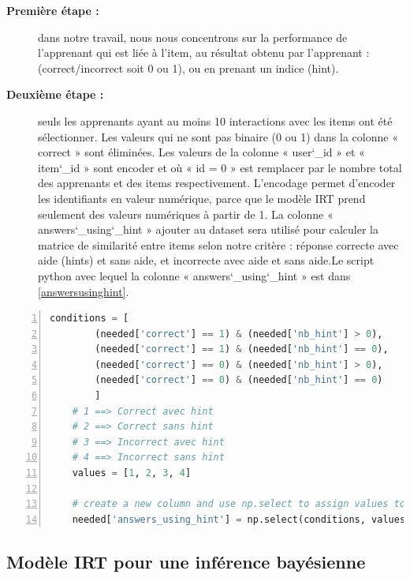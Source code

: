 \begin{description}
    \item[\textbf{Première étape : }] dans notre travail, nous nous concentrons sur la performance de l'apprenant qui est liée à l'item, au résultat obtenu par l'apprenant : (correct/incorrect soit 0 ou 1), ou en prenant un indice (hint).
    \item[\textbf{Deuxième étape : }] seuls les apprenants ayant au moins 10 interactions avec les items ont été sélectionner. Les valeurs qui ne sont pas binaire (0 ou 1) dans la colonne « correct » sont éliminées. Les valeurs de la colonne « user\char`_id »  et « item\char`_id » sont encoder et où « id = 0 » est remplacer par le nombre total des apprenants et des items respectivement. L’encodage permet d’encoder les identifiants en valeur numérique, parce que le modèle IRT prend seulement des valeurs numériques à partir de 1. La colonne « answers\char`_using\char`_hint » ajouter au dataset sera utilisé pour calculer la matrice de similarité entre items selon notre critère : réponse correcte avec aide (hints) et sans aide, et incorrecte avec aide et sans aide.Le script python avec lequel la colonne « answers\char`_using\char`_hint » est dans \ref{answersusinghint}.
\end{description}

\newpage
\begin{lstlisting}[language=Python,label={answersusinghint}, 
	morekeywords={self},
	keywordstyle=\ttb\color{deepblue},
	emph={MyClass,__init__},
	emphstyle=\ttb\color{deepred},
	stringstyle=\color{deepgreen},basicstyle=\scriptsize, frame=l,framesep=4.5mm,framexleftmargin=2.5mm,tabsize=2,numbers=left,fillcolor=\color{blueforest!70},rulecolor=\color{blueforest},numberstyle=\normalfont\tiny\color{white}]
	conditions = [
		(needed['correct'] == 1) & (needed['nb_hint'] > 0),
		(needed['correct'] == 1) & (needed['nb_hint'] == 0),
		(needed['correct'] == 0) & (needed['nb_hint'] > 0),
		(needed['correct'] == 0) & (needed['nb_hint'] == 0)
		]
	# 1 ==> Correct avec hint
	# 2 ==> Correct sans hint
	# 3 ==> Incorrect avec hint
	# 4 ==> Incorrect sans hint
	values = [1, 2, 3, 4]
	
	# create a new column and use np.select to assign values to it using our lists as arguments
	needed['answers_using_hint'] = np.select(conditions, values)
\end{lstlisting}

\subsection{Modèle IRT pour une inférence bayésienne}

